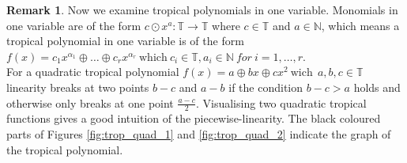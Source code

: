 \documentclass{article}
\theoremstyle{definition}
\newtheorem{remark}[theorem]{Remark}
\begin{document}
\begin{remark}
Now we examine tropical polynomials in one variable. Monomials in one variable are of the form $ c \odot x^{a}: \mathbb{T} \to \mathbb{T}$ where $c \in \mathbb{T}$ and $ a \in \mathbb{N} $, which means a tropical polynomial in one variable is of the form $f(x)=c_1x^{\alpha_1} \oplus \dots \oplus c_rx^{\alpha_r} \ \text{which} \ c_i \in \mathbb{T}, a_i \in \mathbb{N} \ for \ i=1, \dots , r$. \\
For a quadratic tropical polynomial $f(x) = a \oplus bx \oplus cx^{2} \ \text{wich} \ \ a,b,c \in \mathbb{T}$ linearity breaks at two points $b-c$ and $a-b$ if the condition $b-c > a$ holds and otherwise only breaks at one point $\frac{a-c}{2}$. Visualising two quadratic tropical functions gives a good intuition of the piecewise-linearity. The black coloured parts of Figures \ref{fig:trop_quad_1} and \ref{fig:trop_quad_2} indicate the graph of the tropical polynomial.


\end{remark}
\end{document}
